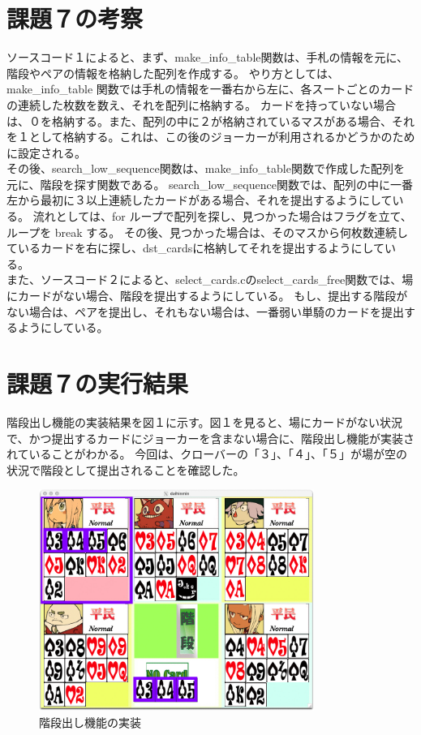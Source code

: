 \documentclass[]{jsarticle}
\begin{document}
\section*{課題７の考察}
ソースコード１によると、まず、make\_info\_table関数は、手札の情報を元に、階段やペアの情報を格納した配列を作成する。
やり方としては、make\_info\_table 関数では手札の情報を一番右から左に、各スートごとのカードの連続した枚数を数え、それを配列に格納する。
カードを持っていない場合は、０を格納する。また、配列の中に２が格納されているマスがある場合、それを１として格納する。これは、この後のジョーカーが利用されるかどうかのために設定される。\\

その後、search\_low\_sequence関数は、make\_info\_table関数で作成した配列を元に、階段を探す関数である。
search\_low\_sequence関数では、配列の中に一番左から最初に３以上連続したカードがある場合、それを提出するようにしている。
流れとしては、for ループで配列を探し、見つかった場合はフラグを立て、ループを break する。
その後、見つかった場合は、そのマスから何枚数連続しているカードを右に探し、dst\_cardsに格納してそれを提出するようにしている。\\

また、ソースコード２によると、select\_cards.cのselect\_cards\_free関数では、場にカードがない場合、階段を提出するようにしている。
もし、提出する階段がない場合は、ペアを提出し、それもない場合は、一番弱い単騎のカードを提出するようにしている。

\newpage
\section*{課題７の実行結果}
階段出し機能の実装結果を図１に示す。図１を見ると、場にカードがない状況で、かつ提出するカードにジョーカーを含まない場合に、階段出し機能が実装されていることがわかる。
今回は、クローバーの「３」、「４」、「５」が場が空の状況で階段として提出されることを確認した。\\
\begin{figure}[h]
  \centering
  \includegraphics[width=0.8\textwidth]{./kadai7kaidan.jpg}
  \caption{階段出し機能の実装}
\end{figure}
\end{document}
